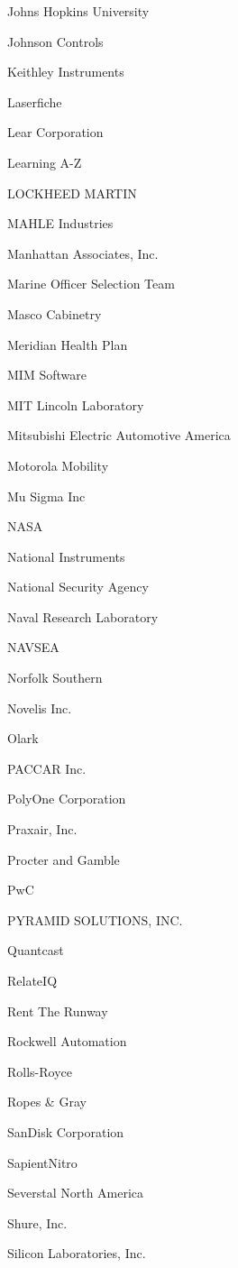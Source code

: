 \documentclass[twoside]{article}
\begin{document}
\begin{center}
\begin{multicols}{5}
\begin{FlushLeft}
\begin{compactitem}
\item Johns Hopkins University
\item Johnson Controls
\item Keithley Instruments
\item Laserfiche
\item Lear Corporation
\item Learning A-Z
\item LOCKHEED MARTIN
\item MAHLE Industries
\item Manhattan Associates, Inc.
\item Marine Officer Selection Team
\item Masco Cabinetry
\item Meridian Health Plan
\item MIM Software
\item MIT Lincoln Laboratory
\item Mitsubishi Electric Automotive America
\item Motorola Mobility
\item Mu Sigma Inc
\item NASA
\item National Instruments
\item National Security Agency
\item Naval Research Laboratory
\item NAVSEA
\item Norfolk Southern
\item Novelis Inc.
\item Olark
\item PACCAR Inc.
\item PolyOne Corporation
\item Praxair, Inc.
\item Procter and Gamble
\item PwC
\item PYRAMID SOLUTIONS, INC.
\item Quantcast
\item RelateIQ
\item Rent The Runway
\item Rockwell Automation
\item Rolls-Royce
\item Ropes \& Gray
\item SanDisk Corporation
\item SapientNitro
\item Severstal North America
\item Shure, Inc.
\item Silicon Laboratories, Inc.

\end{compactitem}
\end{FlushLeft}
\end{multicols}
\end{center}
\end{document}
